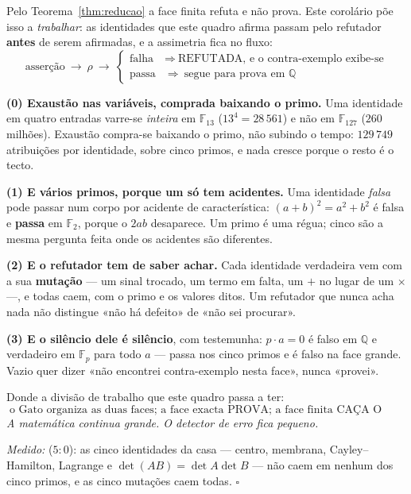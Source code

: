 \documentclass[livro.tex]{subfiles}
\begin{document}
\begin{corolario}\label{cor:refutador}
Pelo Teorema~\ref{thm:reducao} a face finita refuta e não prova. Este
corolário põe isso a \emph{trabalhar}: as identidades que este quadro
afirma passam pelo refutador \textbf{antes} de serem afirmadas, e a
assimetria fica no fluxo:
\[
\boxed{\;
\text{asserção}\ \longrightarrow\ \rho\ \longrightarrow\
\begin{cases}
\text{falha} & \Rightarrow\ \text{REFUTADA, e o contra-exemplo exibe-se}\\
\text{passa} & \Rightarrow\ \text{segue para prova em }\mathbb{Q}
\end{cases}\;}
\]

\textbf{(0) Exaustão nas variáveis, comprada baixando o primo.} Uma
identidade em quatro entradas varre-se \emph{inteira} em $\mathbb{F}_{13}$
($13^4=28\,561$) e não em $\mathbb{F}_{127}$ ($260$ milhões). Exaustão
compra-se baixando o primo, não subindo o tempo: $129\,749$ atribuições
por identidade, sobre cinco primos, e nada cresce porque o resto é o
tecto.

\textbf{(1) E vários primos, porque um só tem acidentes.} Uma identidade
\emph{falsa} pode passar num corpo por acidente de característica:
$(a+b)^2=a^2+b^2$ é falsa e \textbf{passa} em $\mathbb{F}_2$, porque o
$2ab$ desaparece. Um primo é uma régua; cinco são a mesma pergunta feita
onde os acidentes são diferentes.

\textbf{(2) E o refutador tem de saber achar.} Cada identidade verdadeira
vem com a sua \textbf{mutação} --- um sinal trocado, um termo em falta,
um $+$ no lugar de um $\times$ ---, e todas caem, com o primo e os
valores ditos. Um refutador que nunca acha nada não distingue «não há
defeito» de «não sei procurar».

\textbf{(3) E o silêncio dele é silêncio}, com testemunha: $p\cdot a=0$ é
falso em $\mathbb{Q}$ e verdadeiro em $\mathbb{F}_p$ para todo $a$ ---
passa nos cinco primos e é falso na face grande. Vazio quer dizer «não
encontrei contra-exemplo nesta face», nunca «provei».

\medskip
\noindent Donde a divisão de trabalho que este quadro passa a ter:
\[
\boxed{\;\text{o Gato organiza as duas faces; a face exacta PROVA; a face
finita CAÇA O CONTRA-EXEMPLO.}\;}
\]
\emph{A matemática continua grande. O detector de erro fica pequeno.}

\emph{Medido:}  ($5{:}0$): as cinco identidades da
casa --- centro, membrana, Cayley--Hamilton, Lagrange e
$\det(AB)=\det A\det B$ --- não caem em nenhum dos cinco primos, e as
cinco mutações caem todas. $\square$
\end{corolario}
\end{document}
